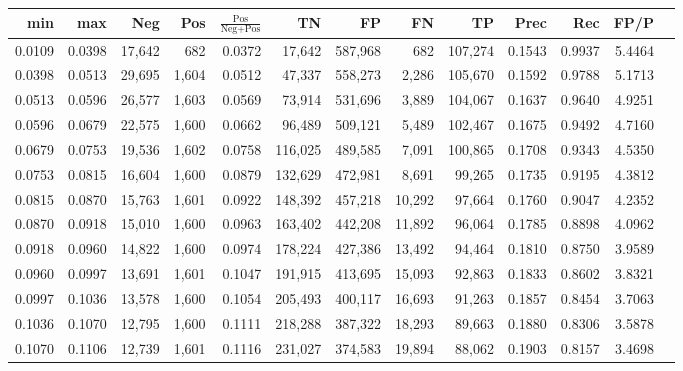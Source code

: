\begin{tabular}{rrrrrrrrrrrrr}
\toprule
   min &    max &    Neg &   Pos & $\frac{\text{Pos}}{\text{Neg}+\text{Pos}}$ &      TN &      FP &      FN &      TP &   Prec &    Rec &   FP/P \\
\midrule
0.0109 & 0.0398 & 17,642 &   682 &                                     0.0372 &  17,642 & 587,968 &     682 & 107,274 & 0.1543 & 0.9937 & 5.4464 \\
0.0398 & 0.0513 & 29,695 & 1,604 &                                     0.0512 &  47,337 & 558,273 &   2,286 & 105,670 & 0.1592 & 0.9788 & 5.1713 \\
0.0513 & 0.0596 & 26,577 & 1,603 &                                     0.0569 &  73,914 & 531,696 &   3,889 & 104,067 & 0.1637 & 0.9640 & 4.9251 \\
0.0596 & 0.0679 & 22,575 & 1,600 &                                     0.0662 &  96,489 & 509,121 &   5,489 & 102,467 & 0.1675 & 0.9492 & 4.7160 \\
0.0679 & 0.0753 & 19,536 & 1,602 &                                     0.0758 & 116,025 & 489,585 &   7,091 & 100,865 & 0.1708 & 0.9343 & 4.5350 \\
0.0753 & 0.0815 & 16,604 & 1,600 &                                     0.0879 & 132,629 & 472,981 &   8,691 &  99,265 & 0.1735 & 0.9195 & 4.3812 \\
0.0815 & 0.0870 & 15,763 & 1,601 &                                     0.0922 & 148,392 & 457,218 &  10,292 &  97,664 & 0.1760 & 0.9047 & 4.2352 \\
0.0870 & 0.0918 & 15,010 & 1,600 &                                     0.0963 & 163,402 & 442,208 &  11,892 &  96,064 & 0.1785 & 0.8898 & 4.0962 \\
0.0918 & 0.0960 & 14,822 & 1,600 &                                     0.0974 & 178,224 & 427,386 &  13,492 &  94,464 & 0.1810 & 0.8750 & 3.9589 \\
0.0960 & 0.0997 & 13,691 & 1,601 &                                     0.1047 & 191,915 & 413,695 &  15,093 &  92,863 & 0.1833 & 0.8602 & 3.8321 \\
0.0997 & 0.1036 & 13,578 & 1,600 &                                     0.1054 & 205,493 & 400,117 &  16,693 &  91,263 & 0.1857 & 0.8454 & 3.7063 \\
0.1036 & 0.1070 & 12,795 & 1,600 &                                     0.1111 & 218,288 & 387,322 &  18,293 &  89,663 & 0.1880 & 0.8306 & 3.5878 \\
0.1070 & 0.1106 & 12,739 & 1,601 &                                     0.1116 & 231,027 & 374,583 &  19,894 &  88,062 & 0.1903 & 0.8157 & 3.4698 \\

\end{tabular}
